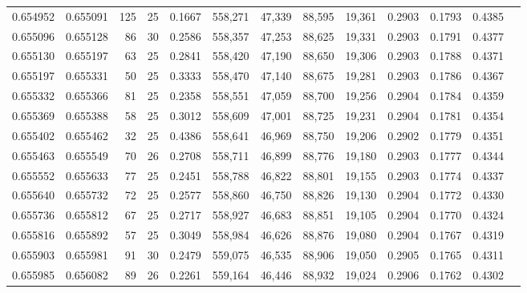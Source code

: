 \begin{tabular}{rrrrrrrrrrrrr}
0.654952 & 0.655091 & 125 &  25 &                                     0.1667 & 558,271 &  47,339 &  88,595 &  19,361 & 0.2903 & 0.1793 & 0.4385 \\
0.655096 & 0.655128 &  86 &  30 &                                     0.2586 & 558,357 &  47,253 &  88,625 &  19,331 & 0.2903 & 0.1791 & 0.4377 \\
0.655130 & 0.655197 &  63 &  25 &                                     0.2841 & 558,420 &  47,190 &  88,650 &  19,306 & 0.2903 & 0.1788 & 0.4371 \\
0.655197 & 0.655331 &  50 &  25 &                                     0.3333 & 558,470 &  47,140 &  88,675 &  19,281 & 0.2903 & 0.1786 & 0.4367 \\
0.655332 & 0.655366 &  81 &  25 &                                     0.2358 & 558,551 &  47,059 &  88,700 &  19,256 & 0.2904 & 0.1784 & 0.4359 \\
0.655369 & 0.655388 &  58 &  25 &                                     0.3012 & 558,609 &  47,001 &  88,725 &  19,231 & 0.2904 & 0.1781 & 0.4354 \\
0.655402 & 0.655462 &  32 &  25 &                                     0.4386 & 558,641 &  46,969 &  88,750 &  19,206 & 0.2902 & 0.1779 & 0.4351 \\
0.655463 & 0.655549 &  70 &  26 &                                     0.2708 & 558,711 &  46,899 &  88,776 &  19,180 & 0.2903 & 0.1777 & 0.4344 \\
0.655552 & 0.655633 &  77 &  25 &                                     0.2451 & 558,788 &  46,822 &  88,801 &  19,155 & 0.2903 & 0.1774 & 0.4337 \\
0.655640 & 0.655732 &  72 &  25 &                                     0.2577 & 558,860 &  46,750 &  88,826 &  19,130 & 0.2904 & 0.1772 & 0.4330 \\
0.655736 & 0.655812 &  67 &  25 &                                     0.2717 & 558,927 &  46,683 &  88,851 &  19,105 & 0.2904 & 0.1770 & 0.4324 \\
0.655816 & 0.655892 &  57 &  25 &                                     0.3049 & 558,984 &  46,626 &  88,876 &  19,080 & 0.2904 & 0.1767 & 0.4319 \\
0.655903 & 0.655981 &  91 &  30 &                                     0.2479 & 559,075 &  46,535 &  88,906 &  19,050 & 0.2905 & 0.1765 & 0.4311 \\
0.655985 & 0.656082 &  89 &  26 &                                     0.2261 & 559,164 &  46,446 &  88,932 &  19,024 & 0.2906 & 0.1762 & 0.4302 \\

\end{tabular}
